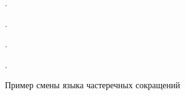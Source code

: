 \begin{figure}[H]
    \centering
    \begin{minipage}[c]{0.5\textwidth}
        \begin{Latexcode}
             
             
            .

             
             
             .
        \end{Latexcode}
    \end{minipage}
    \hfill
    \begin{minipage}[c]{0.4\textwidth}
        \small
           .
        \vspace*{\baselineskip}

          
          .
    \end{minipage}

    \caption{Пример смены языка частеречных сокращений}
\end{figure}